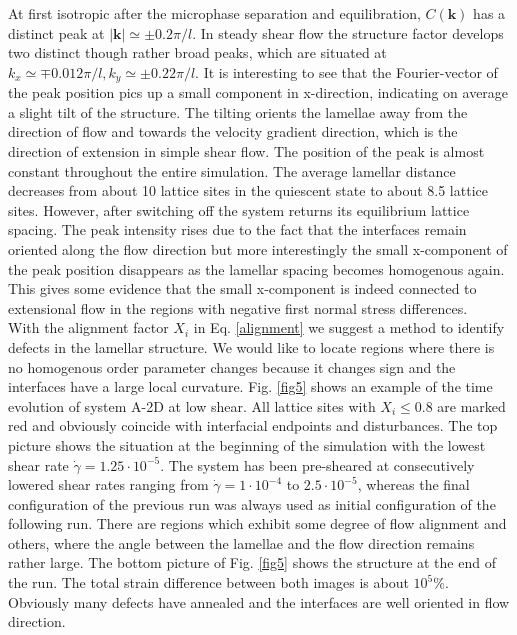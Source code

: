\documentclass[8.5pt,twoside,twocolumn]{article}
\newcommand{\e}[1]{\cdot10^{#1}}
\newcommand{\gd}{\dot{\gamma}}
\begin{document}
At first isotropic after the microphase separation and equilibration, $C({\bm k})$ has a distinct peak at $|{\bm k}|\simeq \pm0.2\pi/l$.
In steady shear flow the structure factor develops two distinct though rather broad peaks, which are situated at $k_x\simeq\mp 0.012\pi/l, k_y\simeq\pm 0.22 \pi/l$.
It is interesting to see that the Fourier-vector of the peak position pics up a small component in x-direction, indicating on average a slight tilt of the structure.
The tilting orients the lamellae away from the direction of flow and towards the velocity gradient direction, which is the direction of extension in simple shear flow.
The position of the peak is almost constant throughout the entire simulation.
The average lamellar distance decreases from about 10 lattice sites in the quiescent state to about 8.5 lattice sites.
However, after switching off the system returns its equilibrium lattice spacing.
The peak intensity rises due to the fact that the interfaces remain oriented along the flow direction but more interestingly the small x-component of the peak position disappears as the lamellar spacing becomes homogenous again.
This gives some evidence that the small x-component is indeed connected to extensional flow in the regions with negative first normal stress differences.\\
With the alignment factor $X_i$ in Eq. \ref{alignment} we suggest a method to identify defects in the lamellar structure.
We would like to locate regions where there is no homogenous order parameter changes because it changes sign and the interfaces have a large local curvature.
Fig. \ref{fig5} shows an example of the time evolution of system A-2D at low shear.
All lattice sites with $X_i\le0.8$ are marked red and obviously coincide with interfacial endpoints and disturbances.
The top picture shows the situation at the beginning of the simulation with the lowest shear rate $\dot{\gamma}=1.25\e{-5}$.
The system has been pre-sheared at consecutively lowered shear rates ranging from $\gd=1\e{-4}$ to $2.5\e{-5}$, whereas the final configuration of the previous run was always used as initial configuration of the following run.
There are regions which exhibit some degree of flow alignment and others, where the angle between the lamellae and the flow direction remains rather large.
The bottom picture of Fig. \ref{fig5} shows the structure at the end of the run.
The total strain difference between both images is about $10^{5}\%$. 
Obviously many defects have annealed and the interfaces are well oriented in flow direction.
\end{document}
